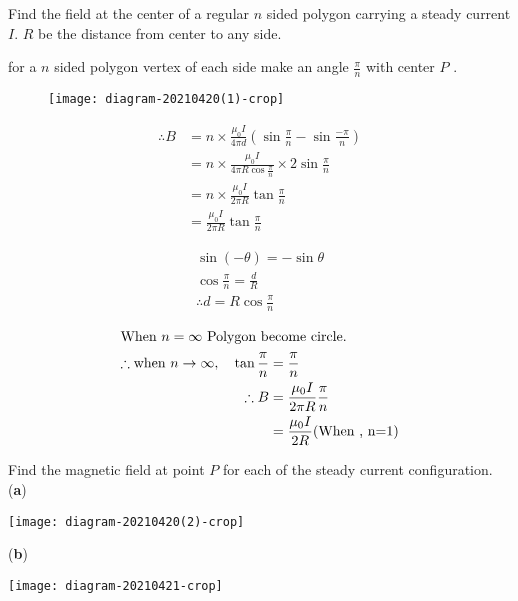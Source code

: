 \begin{exercise}
	Find the field at the center of a regular $n$ sided polygon carrying a steady current $I$. $R$ be the distance from center to any side.
\end{exercise}
\begin{answer}
	 for a $n$ sided polygon vertex of each side make an angle $\frac{\pi}{n}$ with center $P$ .\\
	 \begin{figure}[H]
	 	\centering
	 	\texttt{[image: diagram-20210420(1)-crop]}
	 \end{figure}
 
	\begin{minipage}{0.60\textwidth}\hfill
		\begin{align*}
		\therefore B&=n\times\frac{\mu_0 I}{4 \pi d}(\sin\frac{\pi}{n}-\sin\frac{-\pi}{n})\\
		&=n\times\frac{\mu_0 I}{4 \pi R \cos\frac{\pi}{n}}\times2 \sin\frac{\pi}{n}\\
		&=n\times\frac{\mu_0 I}{2 \pi R}\tan \frac{\pi}{n}\\
		&=\frac{\mu_0 I}{2 \pi R}\tan \frac{\pi}{n}
		\end{align*}
	\end{minipage}
	\begin{minipage}{0.40\textwidth}
		\begin{align*}
		\sin(-\theta)=-\sin \theta\\
		\cos\frac{\pi}{n}=\frac{d}{R}\\
		\therefore d=R\cos\frac{\pi}{n}
		\end{align*}
	\end{minipage}

	\begin{corollary}
		\begin{align*}
			\intertext{When $n =\infty$\  Polygon become circle.}
		\therefore \text{when}\	n\rightarrow\infty, \quad\tan\frac{\pi}{n}&=\frac{\pi}{n}\\
		\therefore B&=\frac{\mu_0 I}{2 \pi R}\frac{\pi}{n}\\&=\frac{\mu_0I}{2R} (\text{When , n=1})
		\end{align*}
	\end{corollary}
\end{answer}
\begin{exercise}
Find the magnetic field at point $P$ for each of the steady current configuration.\\
	(\textbf{a}) 
	\begin{minipage}{0.25\textwidth}\hfill
		\centering
		\texttt{[image: diagram-20210420(2)-crop]}
	\end{minipage} \hspace{2cm}
	(\textbf{b})
		\begin{minipage}{0.25\textwidth}\hfill
				\centering
			\texttt{[image: diagram-20210421-crop]}
		\end{minipage}
\end{exercise}
